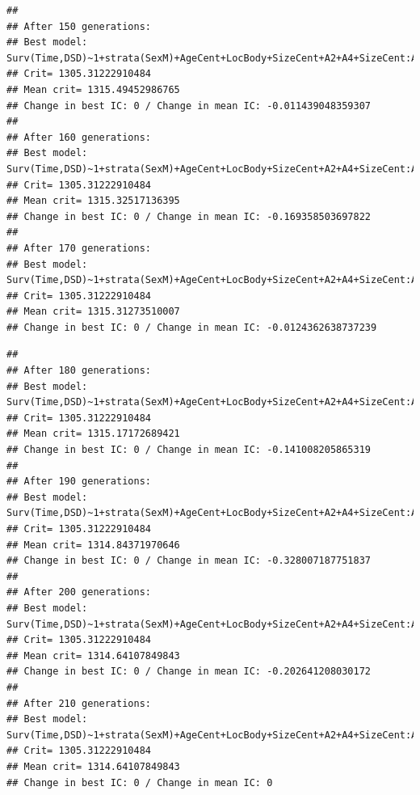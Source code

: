 \documentclass{article}\usepackage[]{graphicx}\usepackage[]{color}
\makeatletter
\newenvironment{kframe}{%
 \def\at@end@of@kframe{}%
 \ifinner\ifhmode%
  \def\at@end@of@kframe{\end{minipage}}%
  \begin{minipage}{\columnwidth}%
 \fi\fi%
 \def\FrameCommand##1{\hskip\@totalleftmargin \hskip-\fboxsep
 \colorbox{shadecolor}{##1}\hskip-\fboxsep
     \hskip-\linewidth \hskip-\@totalleftmargin \hskip\columnwidth}%
 \MakeFramed {\advance\hsize-\width
   \@totalleftmargin\z@ \linewidth\hsize
   \@setminipage}}%
 {\par\unskip\endMakeFramed%
 \at@end@of@kframe}
\newenvironment{knitrout}{}{} %
\makeatother
\begin{document}
\begin{knitrout}
\begin{kframe}
{\ttfamily\noindent\color{warningcolor}{\#\# Warning in fitter(X, Y, strats, offset, init, control, weights = weights, : Loglik converged before variable\ \ 2 ; beta may be infinite.}}\begin{verbatim}
## 
## After 150 generations:
## Best model: Surv(Time,DSD)~1+strata(SexM)+AgeCent+LocBody+SizeCent+A2+A4+SizeCent:AgeCent+strata(SexM):SizeCent
## Crit= 1305.31222910484
## Mean crit= 1315.49452986765
## Change in best IC: 0 / Change in mean IC: -0.011439048359307
## 
## After 160 generations:
## Best model: Surv(Time,DSD)~1+strata(SexM)+AgeCent+LocBody+SizeCent+A2+A4+SizeCent:AgeCent+strata(SexM):SizeCent
## Crit= 1305.31222910484
## Mean crit= 1315.32517136395
## Change in best IC: 0 / Change in mean IC: -0.169358503697822
## 
## After 170 generations:
## Best model: Surv(Time,DSD)~1+strata(SexM)+AgeCent+LocBody+SizeCent+A2+A4+SizeCent:AgeCent+strata(SexM):SizeCent
## Crit= 1305.31222910484
## Mean crit= 1315.31273510007
## Change in best IC: 0 / Change in mean IC: -0.0124362638737239
\end{verbatim}


{\ttfamily\noindent\color{warningcolor}{\#\# Warning in fitter(X, Y, strats, offset, init, control, weights = weights, : Loglik converged before variable\ \ 13 ; beta may be infinite.}}\begin{verbatim}
## 
## After 180 generations:
## Best model: Surv(Time,DSD)~1+strata(SexM)+AgeCent+LocBody+SizeCent+A2+A4+SizeCent:AgeCent+strata(SexM):SizeCent
## Crit= 1305.31222910484
## Mean crit= 1315.17172689421
## Change in best IC: 0 / Change in mean IC: -0.141008205865319
## 
## After 190 generations:
## Best model: Surv(Time,DSD)~1+strata(SexM)+AgeCent+LocBody+SizeCent+A2+A4+SizeCent:AgeCent+strata(SexM):SizeCent
## Crit= 1305.31222910484
## Mean crit= 1314.84371970646
## Change in best IC: 0 / Change in mean IC: -0.328007187751837
## 
## After 200 generations:
## Best model: Surv(Time,DSD)~1+strata(SexM)+AgeCent+LocBody+SizeCent+A2+A4+SizeCent:AgeCent+strata(SexM):SizeCent
## Crit= 1305.31222910484
## Mean crit= 1314.64107849843
## Change in best IC: 0 / Change in mean IC: -0.202641208030172
## 
## After 210 generations:
## Best model: Surv(Time,DSD)~1+strata(SexM)+AgeCent+LocBody+SizeCent+A2+A4+SizeCent:AgeCent+strata(SexM):SizeCent
## Crit= 1305.31222910484
## Mean crit= 1314.64107849843
## Change in best IC: 0 / Change in mean IC: 0
\end{verbatim}



\end{kframe}
\end{knitrout}
\end{document}
